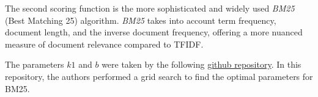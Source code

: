 The second scoring function is the more sophisticated and widely used \textit{BM25} (Best Matching 25) algorithm. 
\textit{BM25} takes into account term frequency, document length, and the inverse document frequency, offering a more nuanced measure of 
document relevance compared to TFIDF.

The parameters \(k1\) and \(b\) were taken by the following 
\href{https://github.com/castorini/pyserini/blob/master/docs/experiments-msmarco-passage.md}{github repository}. 
In this repository, the authors performed a grid search to find the optimal parameters for BM25.


